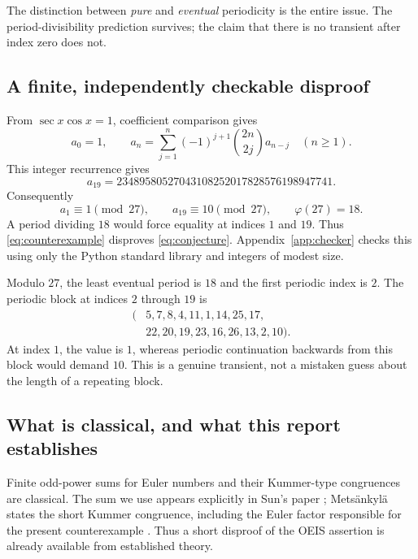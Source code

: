 \documentclass[11pt,a4paper]{article}
\numberwithin{equation}{section}
\theoremstyle{definition}
\begin{document}
The distinction between \emph{pure} and \emph{eventual} periodicity is the
entire issue. The period-divisibility prediction survives; the claim that
there is no transient after index zero does not.

\subsection{A finite, independently checkable disproof}

From $\sec x\cos x=1$, coefficient comparison gives
\begin{equation}\label{eq:recurrence}
a_0=1,\qquad
a_n=\sum_{j=1}^{n}(-1)^{j+1}\binom{2n}{2j}a_{n-j}\quad(n\ge1).
\end{equation}
This integer recurrence gives
\[
a_{19}=23489580527043108252017828576198947741.
\]
Consequently
\begin{equation}\label{eq:counterexample}
a_1\equiv1\pmod{27},\qquad a_{19}\equiv10\pmod{27},
\qquad \varphi(27)=18.
\end{equation}
A period dividing $18$ would force equality at indices $1$ and $19$.
Thus \eqref{eq:counterexample} disproves \eqref{eq:conjecture}.
Appendix~\ref{app:checker} checks this using only the Python standard
library and integers of modest size.

Modulo $27$, the least eventual period is $18$ and the first periodic
index is $2$. The periodic block at indices $2$ through $19$ is
\[
\begin{split}
(&5,7,8,4,11,1,14,25,17,\\
 &22,20,19,23,16,26,13,2,10).
\end{split}
\]
At index $1$, the value is $1$, whereas periodic continuation backwards
from this block would demand $10$. This is a genuine transient, not a
mistaken guess about the length of a repeating block.

\subsection{What is classical, and what this report establishes}

Finite odd-power sums for Euler numbers and their Kummer-type congruences
are classical. The sum we use appears explicitly in Sun's paper
\cite[Eq.~(1.1)]{sun}; Mets\"ankyl\"a states the short Kummer congruence,
including the Euler factor responsible for the present counterexample
\cite[p.~161]{metsankyla}. Thus a short disproof of the OEIS assertion is
already available from established theory.
\end{document}
